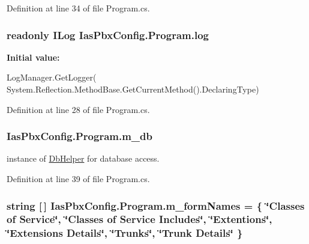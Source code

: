 Definition at line 34 of file Program.cs.\hypertarget{class_ias_pbx_config_1_1_program_aa85a518f60538b87328eee5503af726c}{
\subsubsection[{log}]{\setlength{\rightskip}{0pt plus 5cm}readonly ILog {\bf IasPbxConfig.Program.log}}}
\label{class_ias_pbx_config_1_1_program_aa85a518f60538b87328eee5503af726c}
{\bfseries Initial value:}
\begin{DoxyCode}
 LogManager.GetLogger(
            System.Reflection.MethodBase.GetCurrentMethod().DeclaringType)
\end{DoxyCode}


Definition at line 28 of file Program.cs.\hypertarget{class_ias_pbx_config_1_1_program_a6342106d36b6b4c21bcc82f3113ff69b}{
\subsubsection[{m\_\-db}]{ {\bf IasPbxConfig.Program.m\_\-db}}}
\label{class_ias_pbx_config_1_1_program_a6342106d36b6b4c21bcc82f3113ff69b}


instance of \hyperlink{class_ias_pbx_config_1_1_db_helper}{DbHelper} for database access. 

Definition at line 39 of file Program.cs.\hypertarget{class_ias_pbx_config_1_1_program_a2ddc498936b6e3f273297c78de615d3a}{
\subsubsection[{m\_\-formNames}]{\setlength{\rightskip}{0pt plus 5cm}string \mbox{[}$\,$\mbox{]} {\bf IasPbxConfig.Program.m\_\-formNames} = \{ \char`\"{}Classes of Service\char`\"{}, \char`\"{}Classes of Service Includes\char`\"{}, \char`\"{}Extentions\char`\"{}, \char`\"{}{\bf Extensions} Details\char`\"{}, \char`\"{}{\bf Trunks}\char`\"{}, \char`\"{}Trunk Details\char`\"{} \}}}
\label{class_ias_pbx_config_1_1_program_a2ddc498936b6e3f273297c78de615d3a}


